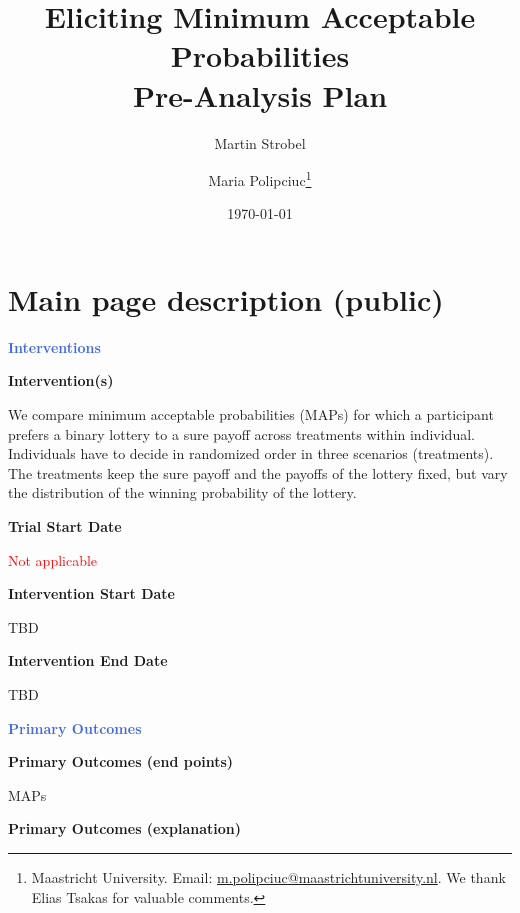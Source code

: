 \usepackage{preliminary}

\title{Eliciting Minimum Acceptable Probabilities \\
\Large Pre-Analysis Plan}
\author{Martin Strobel  \and Maria Polipciuc\thanks{Maastricht University. Email: \url{m.polipciuc@maastrichtuniversity.nl}. We thank Elias Tsakas for valuable comments.}}
\date{\today	\vspace{1cm}}
\titlepage



\begin{titlepage}
\clearpage\maketitle
\thispagestyle{empty}

\end{titlepage}
\section{Main page description (public)}
\large \textcolor{RoyalBlue}{\textbf{Interventions}}

\normalsize \noindent \textcolor{NavyBlue}{\textbf{Intervention(s)}}

We compare minimum acceptable probabilities (MAPs) for which a participant prefers a binary lottery to a sure payoff across treatments within individual.
Individuals have to decide in randomized order in three scenarios (treatments).
The treatments keep the sure payoff and the payoffs of the lottery fixed, but vary the distribution of the winning probability of the lottery.

\noindent \textcolor{NavyBlue}{\textbf{Trial Start Date}}

\textcolor{red}{Not applicable}

\noindent \textcolor{NavyBlue}{\textbf{Intervention Start Date}}

TBD

\noindent \textcolor{NavyBlue}{\textbf{Intervention End Date}}

TBD



\large \noindent \textcolor{RoyalBlue}{\textbf{Primary Outcomes}}

\normalsize \noindent \textcolor{NavyBlue}{\textbf{Primary Outcomes (end points)}}

MAPs

\noindent \textcolor{NavyBlue}{\textbf{Primary Outcomes (explanation)}}

